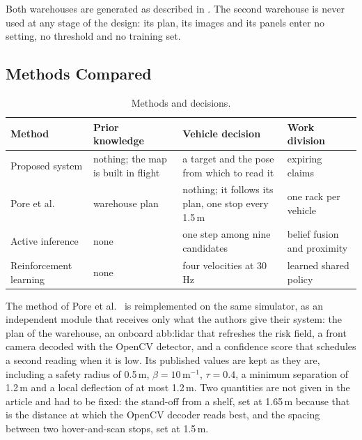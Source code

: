 Both warehouses are generated as described in
. The second warehouse is never used at any stage of
the design: its plan, its images and its panels enter no setting, no threshold
and no training set.

\subsection{Methods Compared}%
\label{subsec:impl:baselines}

\begin{table}[H]
    \centering
    \caption{Methods and decisions.}%
    \label{tab:impl:baselines}
    \footnotesize
    \singlespacing
    \setlength{\tabcolsep}{4pt}
    \renewcommand{\arraystretch}{1.25}
    \begin{tabular}{@{}>{\raggedright\arraybackslash}p{3.3cm}
            >{\raggedright\arraybackslash}p{3.6cm}
            >{\raggedright\arraybackslash}p{5.0cm}
            >{\raggedright\arraybackslash}p{2.9cm}@{}}
        \toprule
        \textbf{Method} & \textbf{Prior knowledge} & \textbf{Vehicle decision} & \textbf{Work division} \\
        \midrule
        Proposed system        & nothing; the map is built in flight & a target and the pose from which to read it         & expiring claims             \\
        \addlinespace
        Pore et al.            & warehouse plan                      & nothing; it follows its plan, one stop every 1.5\,m & one rack per vehicle        \\
        \addlinespace
        Active inference       & none                                & one step among nine candidates                      & belief fusion and proximity \\
        \addlinespace
        Reinforcement learning & none                                & four velocities at 30\,Hz                           & learned shared policy       \\
        \bottomrule
    \end{tabular}
\end{table}

The method of Pore et al.~\cite{pore2026uavqr} is reimplemented on the same
simulator, as an independent module that receives only what the authors give
their system: the plan of the warehouse, an onboard \gls{abb:lidar} that
refreshes the risk field, a front camera decoded with the OpenCV detector, and a
confidence score that schedules a second reading when it is low. Its published
values are kept as they are, including a safety radius of 0.5\,m,
$\beta = 10$\,m$^{-1}$, $\tau = 0.4$, a minimum separation of 1.2\,m and a local
deflection of at most 1.2\,m. Two quantities are not given in the article and had
to be fixed: the stand-off from a shelf, set at 1.65\,m because that is the
distance at which the OpenCV decoder reads best, and the spacing between two
hover-and-scan stops, set at 1.5\,m.

